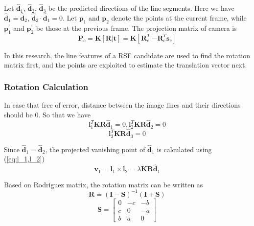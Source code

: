 \documentclass[letterpaper, 10 pt, conference]{ieeeconf}  %
\begin{document}
Let $\hat{\mathbf{d}}_1$, $\hat{\mathbf{d}}_2$, $\hat{\mathbf{d}}_3$ be the predicted directions of the line segments. Here we have $\hat{\mathbf{d}}_1=\hat{\mathbf{d}}_2$, $\hat{\mathbf{d}}_3\cdot\hat{\mathbf{d}}_1=0$. Let $\mathbf{p}_1$ and $\mathbf{p}_2$ denote the points at the current frame, while $\mathbf{p}_1^\prime$ and $\mathbf{p}_2^\prime$ be those at the previous frame.
The projection matrix of camera is 
\begin{equation}
\mathbf{P}_c = \mathbf{K}[\mathbf{R}|\mathbf{t}] = \mathbf{K}[\mathbf{R}_c^T|-\mathbf{R}_c^T\mathbf{s}_c]
\end{equation}

In this research, the line features of a RSF candidate are used to find the rotation matrix first, and the points are exploited to estimate the translation vector next.

\subsubsection{Rotation Calculation}

In case that free of error, distance between the image lines and their directions should be 0. So that we have
\begin{equation}
\mathbf{l}_1^T\mathbf{K}\mathbf{R}\hat{\mathbf{d}}_1=0, \mathbf{l}_2^T\mathbf{K}\mathbf{R}\hat{\mathbf{d}}_2=0
\label{eq:l_1,l_2}
\end{equation}
\begin{equation}
\mathbf{l}_3^T\mathbf{K}\mathbf{R}\hat{\mathbf{d}}_3=0
\label{eq:l_3}
\end{equation}

Since $\hat{\mathbf{d}}_1=\hat{\mathbf{d}}_2$, the projected vanishing point of $\hat{\mathbf{d}}_1$ is calculated using (\ref{eq:l_1,l_2})
\begin{equation}
\mathbf{v}_1 = \mathbf{l}_1\times \mathbf{l}_2 =  \lambda \mathbf{K}\mathbf{R}\hat{\mathbf{d}}_1
\label{eq:vp}
\end{equation}

Based on Rodriguez matrix, the rotation matrix can be written as
\begin{equation}
\mathbf{R}=\left(\mathbf{I}-\mathbf{S}\right)^{-1}\left(\mathbf{I}+\mathbf{S}\right)
\label{eq:Rodriguez_R}
\end{equation}
\begin{equation}
\mathbf{S}=\begin{bmatrix}      0 & -c & -b \\
                                c & 0 & -a \\
                                b & a & 0
                    \end{bmatrix}
\label{eq:Rodriguez_S}
\end{equation}
\end{document}

